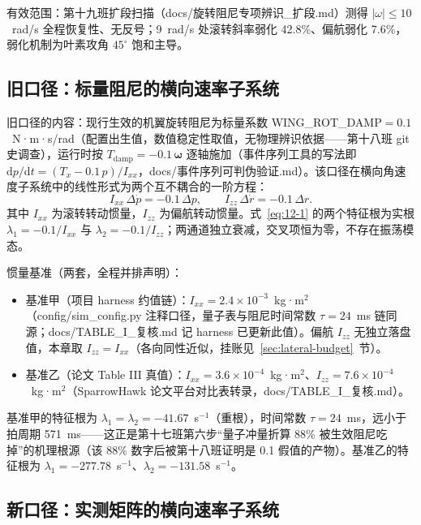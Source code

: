 \documentclass[11pt,a4paper]{ctexart}
\newcommand{\ud}[1]{\dot{#1}}
\newcommand{\bvec}[1]{\boldsymbol{#1}}
\newcommand{\dd}{\mathrm{d}}
\begin{document}
有效范围：第十九班扩段扫描（docs/旋转阻尼专项辨识\_扩段.md）测得 $|\omega|\le 10$~rad/s 全程恢复性、无反号；9~rad/s 处滚转斜率弱化 42.8\%、偏航弱化 7.6\%，弱化机制为叶素攻角 $45^\circ$ 饱和主导。

\subsection{旧口径：标量阻尼的横向速率子系统}

旧口径的内容：现行生效的机翼旋转阻尼为标量系数 WING\_ROT\_DAMP$=0.1$~N·m·s/rad（配置出生值，数值稳定性取值，无物理辨识依据——第十八班 git 史调查），运行时按 $T_{\mathrm{damp}}=-0.1\,\bvec{\omega}$ 逐轴施加（事件序列工具的写法即 $\dd p/\dd t=(T_x-0.1\,p)/I_{xx}$，docs/事件序列可判伪验证.md）。该口径在横向角速度子系统中的线性形式为两个互不耦合的一阶方程：
\begin{equation}\label{eq:12-1}
I_{xx}\,\Delta\ud{p}=-0.1\,\Delta p,\qquad
I_{zz}\,\Delta\ud{r}=-0.1\,\Delta r .
\end{equation}
其中 $I_{xx}$ 为滚转转动惯量，$I_{zz}$ 为偏航转动惯量。式~\eqref{eq:12-1} 的两个特征根为实根 $\lambda_1=-0.1/I_{xx}$ 与 $\lambda_2=-0.1/I_{zz}$；两通道独立衰减，交叉项恒为零，不存在振荡模态。

惯量基准（两套，全程并排声明）：
\begin{itemize}
\item 基准甲（项目 harness 约值链）：$I_{xx}=2.4\times10^{-3}$~kg·m$^2$（config/sim\_config.py 注释口径，量子表与阻尼时间常数 $\tau=24$~ms 链同源；docs/TABLE\_I\_复核.md 记 harness 已更新此值）。偏航 $I_{zz}$ 无独立落盘值，本章取 $I_{zz}=I_{xx}$（各向同性近似，挂账见~\ref{sec:lateral-budget}~节）。
\item 基准乙（论文 Table III 真值）：$I_{xx}=3.6\times10^{-4}$~kg·m$^2$、$I_{zz}=7.6\times10^{-4}$~kg·m$^2$（SparrowHawk 论文平台对比表转录，docs/TABLE\_I\_复核.md）。
\end{itemize}

基准甲的特征根为 $\lambda_1=\lambda_2=-41.67$~s$^{-1}$（重根），时间常数 $\tau=24$~ms，远小于拍周期 571~ms——这正是第十七班第六步“量子冲量折算 88\% 被生效阻尼吃掉”的机理根源（该 88\% 数字后被第十八班证明是 0.1 假值的产物）。基准乙的特征根为 $\lambda_1=-277.78$~s$^{-1}$、$\lambda_2=-131.58$~s$^{-1}$。

\subsection{新口径：实测矩阵的横向速率子系统}
\end{document}
